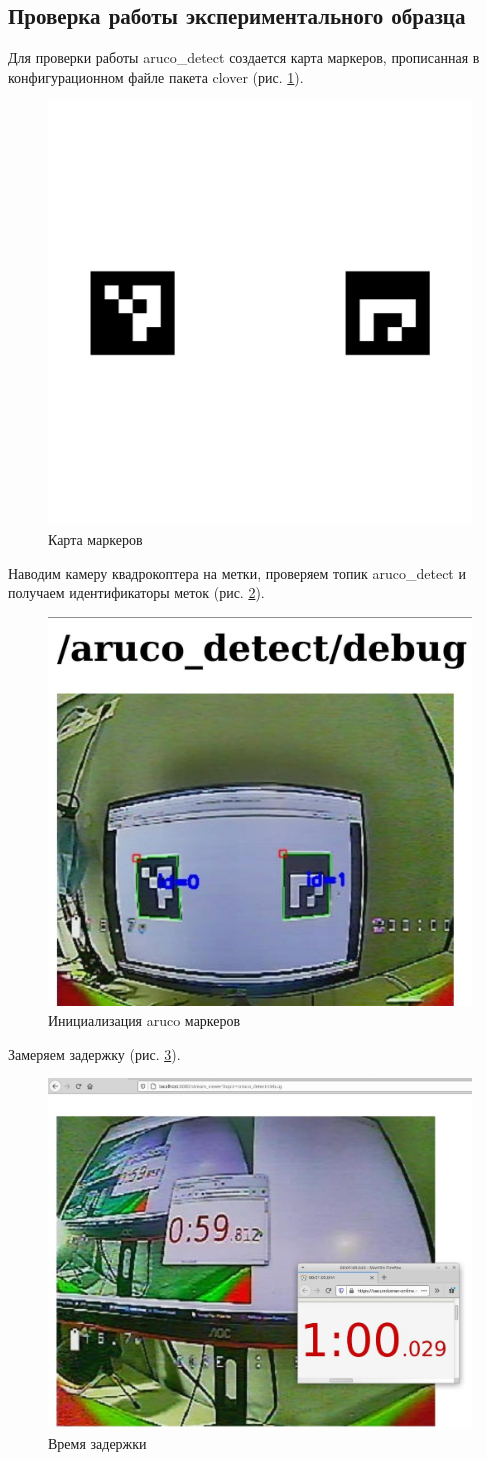 \subsection{Проверка работы экспериментального образца}
Для проверки работы aruco\_detect создается карта маркеров, прописанная в конфигурационном файле пакета clover (рис. \ref{fig:map}).
\begin{figure}[H]
	\centering
	\includegraphics[width=0.5\linewidth]{pics/map}
	\caption{Карта маркеров
	}
	\label{fig:map}
\end{figure}
Наводим камеру квадрокоптера на метки, проверяем топик aruco\_detect и получаем идентификаторы меток (рис. \ref{fig:aruco_detect}).
\begin{figure}[H]
	\centering
	\includegraphics[width=0.5\linewidth]{pics/aruco_detect}
	\caption{Инициализация aruco маркеров
	}
	\label{fig:aruco_detect}
\end{figure}
Замеряем задержку (рис. \ref{fig:time}).
\begin{figure}[H]
	\centering
	\includegraphics[width=0.5\linewidth]{pics/time}
	\caption{Время задержки%
	}
	\label{fig:time}
\end{figure}
